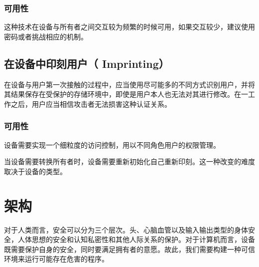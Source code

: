 \documentclass[UTF8]{ctexart}
\begin{document}
    \subsubsection{可用性}
    这种技术在设备与所有者之间交互较为频繁的时候可用，如果交互较少，建议使用密码或者挑战相应的机制。
    \subsection{在设备中印刻用户（ Imprinting）}
    在设备与用户第一次接触的过程中，应当使用尽可能多的不同方式识别用户，并将其结果保存在受保护的存储环境中，即使是用户本人也无法对其进行修改。在一工作之后，用户应当相信攻击者无法损害这种认证关系。
    \subsubsection{可用性}
    设备需要实现一个细粒度的访问控制，用以不同角色用户的权限管理。

    当设备需要转换所有者时，设备需要重新初始化自己重新印刻。这一种改变的难度取决于设备的类型。
	\clearpage
	\section{架构}\label{sec:disanjie}
    对于人类而言，安全可以分为三个层次。头、心脑血管以及输入输出类型的身体安全，人体思想的安全和认知私密性和其他人际关系的保护。对于计算机而言，设备既需要保护自身的安全，同时要满足拥有者的意愿。故此，我们需要构建一种可信环境来运行可能存在危害的程序。
\end{document}
